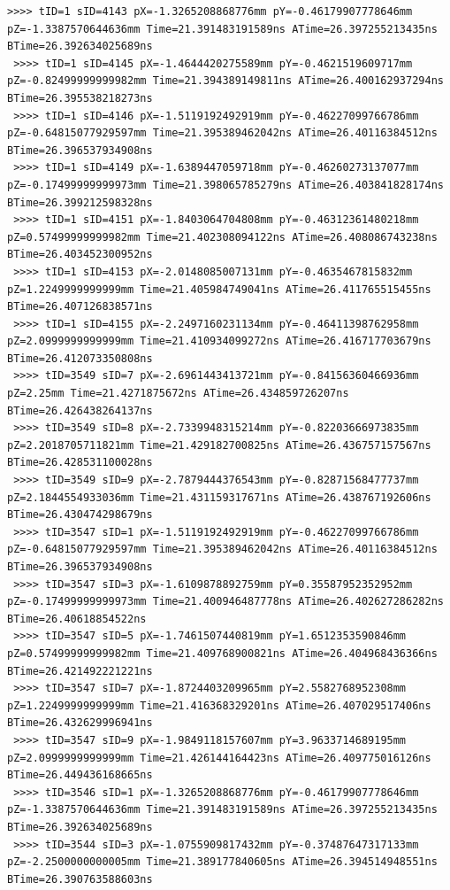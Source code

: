 \documentclass[bachelor,openany,oneside,color]{buaathesis}
\begin{document}
\begin{lstlisting}[caption={eTOF1:MRPC},label={data:MRPC},firstnumber=4397,lastline=4453]
 >>>> tID=1 sID=4143 pX=-1.3265208868776mm pY=-0.46179907778646mm pZ=-1.3387570644636mm Time=21.391483191589ns ATime=26.397255213435ns BTime=26.392634025689ns
 >>>> tID=1 sID=4145 pX=-1.4644420275589mm pY=-0.4621519609717mm pZ=-0.82499999999982mm Time=21.394389149811ns ATime=26.400162937294ns BTime=26.395538218273ns
 >>>> tID=1 sID=4146 pX=-1.5119192492919mm pY=-0.46227099766786mm pZ=-0.64815077929597mm Time=21.395389462042ns ATime=26.40116384512ns BTime=26.396537934908ns
 >>>> tID=1 sID=4149 pX=-1.6389447059718mm pY=-0.46260273137077mm pZ=-0.17499999999973mm Time=21.398065785279ns ATime=26.403841828174ns BTime=26.399212598328ns
 >>>> tID=1 sID=4151 pX=-1.8403064704808mm pY=-0.46312361480218mm pZ=0.57499999999982mm Time=21.402308094122ns ATime=26.408086743238ns BTime=26.403452300952ns
 >>>> tID=1 sID=4153 pX=-2.0148085007131mm pY=-0.4635467815832mm pZ=1.2249999999999mm Time=21.405984749041ns ATime=26.411765515455ns BTime=26.407126838571ns
 >>>> tID=1 sID=4155 pX=-2.2497160231134mm pY=-0.46411398762958mm pZ=2.0999999999999mm Time=21.410934099272ns ATime=26.416717703679ns BTime=26.412073350808ns
 >>>> tID=3549 sID=7 pX=-2.6961443413721mm pY=-0.84156360466936mm pZ=2.25mm Time=21.4271875672ns ATime=26.434859726207ns BTime=26.426438264137ns
 >>>> tID=3549 sID=8 pX=-2.7339948315214mm pY=-0.82203666973835mm pZ=2.2018705711821mm Time=21.429182700825ns ATime=26.436757157567ns BTime=26.428531100028ns
 >>>> tID=3549 sID=9 pX=-2.7879444376543mm pY=-0.82871568477737mm pZ=2.1844554933036mm Time=21.431159317671ns ATime=26.438767192606ns BTime=26.430474298679ns
 >>>> tID=3547 sID=1 pX=-1.5119192492919mm pY=-0.46227099766786mm pZ=-0.64815077929597mm Time=21.395389462042ns ATime=26.40116384512ns BTime=26.396537934908ns
 >>>> tID=3547 sID=3 pX=-1.6109878892759mm pY=0.35587952352952mm pZ=-0.17499999999973mm Time=21.400946487778ns ATime=26.402627286282ns BTime=26.40618854522ns
 >>>> tID=3547 sID=5 pX=-1.7461507440819mm pY=1.6512353590846mm pZ=0.57499999999982mm Time=21.409768900821ns ATime=26.404968436366ns BTime=26.421492221221ns
 >>>> tID=3547 sID=7 pX=-1.8724403209965mm pY=2.5582768952308mm pZ=1.2249999999999mm Time=21.416368329201ns ATime=26.407029517406ns BTime=26.432629996941ns
 >>>> tID=3547 sID=9 pX=-1.9849118157607mm pY=3.9633714689195mm pZ=2.0999999999999mm Time=21.426144164423ns ATime=26.409775016126ns BTime=26.449436168665ns
 >>>> tID=3546 sID=1 pX=-1.3265208868776mm pY=-0.46179907778646mm pZ=-1.3387570644636mm Time=21.391483191589ns ATime=26.397255213435ns BTime=26.392634025689ns
 >>>> tID=3544 sID=3 pX=-1.0755909817432mm pY=-0.37487647317133mm pZ=-2.2500000000005mm Time=21.389177840605ns ATime=26.394514948551ns BTime=26.390763588603ns

\end{lstlisting}
\end{document}
